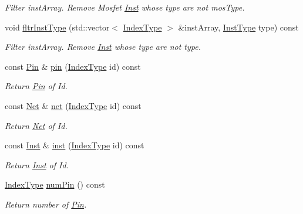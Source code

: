\begin{DoxyCompactItemize}
\begin{DoxyCompactList}\small\item\em Filter inst\+Array. Remove Mosfet \hyperlink{classInst}{Inst} whose type are not mos\+Type. \end{DoxyCompactList}\item 
void \hyperlink{classNetlist_a384627c3bc5a55625a47465771361c08}{fltr\+Inst\+Type} (std\+::vector$<$ \hyperlink{type_8h_a581e8093e28e7362f2b6937296190676}{Index\+Type} $>$ \&inst\+Array, \hyperlink{type_8h_a53644c687d6bc203d9d3d3ee70075f61}{Inst\+Type} type) const
\begin{DoxyCompactList}\small\item\em Filter inst\+Array. Remove \hyperlink{classInst}{Inst} whose type are not type. \end{DoxyCompactList}\item 
const \hyperlink{classPin}{Pin} \& \hyperlink{classNetlist_a0aac5b79ca1a820f0adc7b79f1b0520d}{pin} (\hyperlink{type_8h_a581e8093e28e7362f2b6937296190676}{Index\+Type} id) const
\begin{DoxyCompactList}\small\item\em Return \hyperlink{classPin}{Pin} of Id. \end{DoxyCompactList}\item 
const \hyperlink{classNet}{Net} \& \hyperlink{classNetlist_a066ebef33fd139a25a50af1a144a8361}{net} (\hyperlink{type_8h_a581e8093e28e7362f2b6937296190676}{Index\+Type} id) const
\begin{DoxyCompactList}\small\item\em Return \hyperlink{classNet}{Net} of Id. \end{DoxyCompactList}\item 
const \hyperlink{classInst}{Inst} \& \hyperlink{classNetlist_a0670a50d2a63b33b1fb72c7b0d352c11}{inst} (\hyperlink{type_8h_a581e8093e28e7362f2b6937296190676}{Index\+Type} id) const
\begin{DoxyCompactList}\small\item\em Return \hyperlink{classInst}{Inst} of Id. \end{DoxyCompactList}\item 
\hyperlink{type_8h_a581e8093e28e7362f2b6937296190676}{Index\+Type} \hyperlink{classNetlist_a90a41d0d2a05b8036589136916f2a27b}{num\+Pin} () const
\begin{DoxyCompactList}\small\item\em Return number of \hyperlink{classPin}{Pin}. \end{DoxyCompactList}\item 

\end{DoxyCompactItemize}
